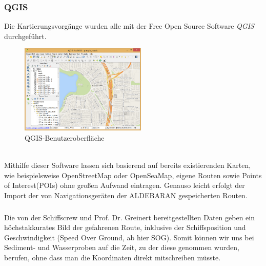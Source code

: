 \subsubsection*{QGIS}
Die Kartierungsvorgänge wurden alle mit der Free Open Source Software \emph{QGIS}\cite{qgis} durchgeführt.
\begin{figure}[ht]
    \centering
    \includegraphics[width=6cm]{Images/QGIS/about-screenshot.png}
    \caption[fig:qgisabout]{QGIS-Benutzeroberfläche}
\end{figure}
\\Mithilfe dieser Software lassen sich basierend auf bereits existierenden Karten, 
wie beispielsweise OpenStreetMap\cite{ostrm} oder OpenSeaMap\cite{oseam}, eigene Routen sowie
Points of Interest(POIs) ohne großen Aufwand eintragen. Genauso leicht erfolgt der Import der von 
Navigationsgeräten der ALDEBARAN gespeicherten Routen. 
\subsubsection*{}
Die von der Schiffscrew und Prof. Dr. Greinert bereitgestellten Daten geben ein höchstakkurates Bild der
gefahrenen Route, inklusive der Schiffsposition und Geschwindigkeit (Speed Over Ground, ab hier SOG).
Somit können wir uns bei Sediment- und Wasserproben auf die Zeit, zu der diese genommen wurden, berufen,
ohne dass man die Koordinaten direkt mitschreiben müsste.
